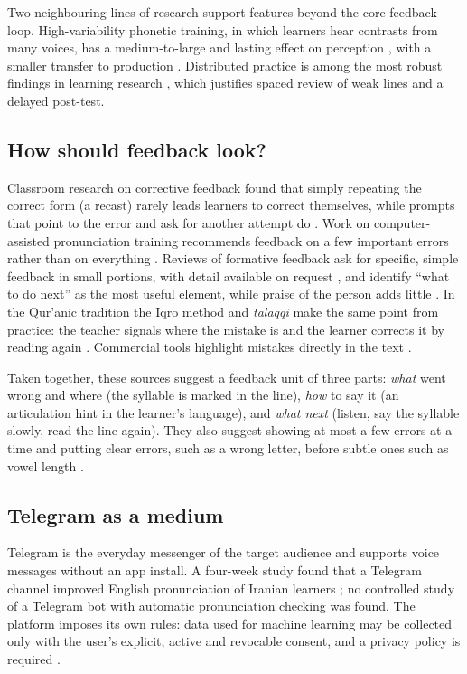 \documentclass[a4paper,14pt]{extarticle}
\begin{document}
Two neighbouring lines of research support features beyond the core feedback loop. High-variability
phonetic training, in which learners hear contrasts from many voices, has a medium-to-large and lasting
effect on perception \cite{SRC-044}, with a smaller transfer to production \cite{SRC-045}. Distributed
practice is among the most robust findings in learning research \cite{SRC-107}, which justifies spaced
review of weak lines and a delayed post-test.

\subsection{How should feedback look?}

Classroom research on corrective feedback found that simply repeating the correct form (a recast) rarely
leads learners to correct themselves, while prompts that point to the error and ask for another attempt
do \cite{SRC-053}. Work on computer-assisted pronunciation training recommends feedback on a few
important errors rather than on everything \cite{SRC-054}. Reviews of formative feedback ask for
specific, simple feedback in small portions, with detail available on request \cite{SRC-055}, and
identify ``what to do next'' as the most useful element, while praise of the person adds little
\cite{SRC-056}. In the Qur'anic tradition the Iqro method and \emph{talaqqi} make the same point from
practice: the teacher signals where the mistake is and the learner corrects it by reading again
\cite{SRC-057,SRC-058}. Commercial tools highlight mistakes directly in the text \cite{SRC-046}.

Taken together, these sources suggest a feedback unit of three parts: \emph{what} went wrong and where
(the syllable is marked in the line), \emph{how} to say it (an articulation hint in the learner's
language), and \emph{what next} (listen, say the syllable slowly, read the line again). They also
suggest showing at most a few errors at a time and putting clear errors, such as a wrong letter, before
subtle ones such as vowel length \cite{SRC-052}.

\subsection{Telegram as a medium}

Telegram is the everyday messenger of the target audience and supports voice messages without an app
install. A four-week study found that a Telegram channel improved English pronunciation of Iranian
learners \cite{SRC-092}; no controlled study of a Telegram bot with automatic pronunciation checking was
found. The platform imposes its own rules: data used for machine learning may be collected only with the
user's explicit, active and revocable consent, and a privacy policy is required \cite{SRC-033}.
\end{document}
